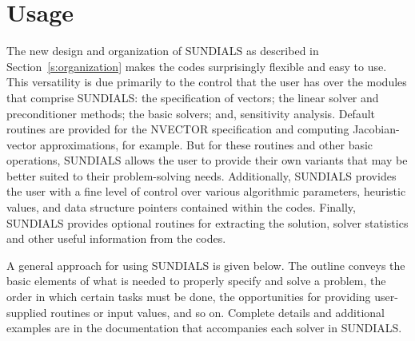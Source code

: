 \section{Usage} 
\label{s:usage}

The new design and organization of SUNDIALS 
as described in Section~\ref{s:organization}
makes the codes surprisingly flexible and easy to use.
This versatility is due primarily to the control that the user has
over the modules that comprise SUNDIALS: the specification of vectors;
the linear solver and preconditioner methods; the basic solvers; and,
sensitivity analysis.
Default routines are provided for the NVECTOR specification and
computing Jacobian-vector approximations, for example. But for these
routines and other basic operations, SUNDIALS allows the user to provide
their own variants that may be better suited to their problem-solving
needs. 
Additionally, SUNDIALS provides the user with a fine level of control
over various algorithmic parameters, heuristic values, and data
structure pointers contained within the codes.
Finally, SUNDIALS provides optional routines for extracting the
solution, solver statistics and other useful information from the codes.

A general approach for using SUNDIALS is given below. 
The outline conveys the basic elements of what is needed to properly
specify and solve a problem, the order in which certain tasks must be
done, the opportunities for providing user-supplied
routines or input values, and so on.
Complete details and additional examples are in the documentation that
accompanies each solver in SUNDIALS.

